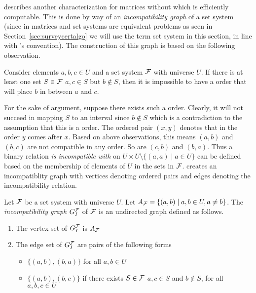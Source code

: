 \cite{mcc04} describes another characterization for matrices without
\COP which is efficiently computable. This is done by way of an {\em
  incompatibility graph} of a set system (since \COP in
  matrices and set systems are equivalent problems as seen in
  Section~\ref{sec:surveycertalgo} we will use the term set system in
  this section, in line with \cite{mcc04}'s convention). The
construction of this graph is based on the following observation.

\begin{observation} 
  Consider elements $a, b, c \in U$ and a set system ${\cal F}$ with
  universe $U$. If there is at least one set $S \in {\cal F}$ \stt $a, c
  \in S$ but $b \notin S$, then it is impossible to have a \COP order
  that will place $b$ in between $a$ and $c$. 
\end{observation}

For the sake of argument, suppose there exists such a \COP
order. Clearly, it will not succeed in mapping $S$ to an interval
since $b \notin S$ which is a contradiction to the assumption that
this is a \COP order.  The ordered pair $(x,y)$ denotes that in the
\COP order $y$ comes after $x$. Based on above observations, this
means $(a,b)$ and $(b,c)$ are not compatible in any \COP order. So are
$(c,b)$ and $(b,a)$.  Thus a binary relation {\em is incompatible
  with} on $U \times U \setminus \{(a,a) \mid a \in U\}$ can be
defined based on the membership of elements of $U$ in the sets in
${\cal F}$.  \cite{mcc04} creates an incompatiblity graph with vertices
denoting ordered pairs and edges denoting the incompatibility
relation.

\begin{definition}
  \label{def:incompatibility}
  Let ${\cal F}$ be a set system with universe $U$. Let $A_{{\cal F}} = \{(a,b)
  \mid a, b \in U, a \ne b\}$. The {\em incompatibility graph}
  $G_I^{\cal F}$ of ${\cal F}$ is an undirected graph defined as follows.
  \begin{enumerate}
  \item   The vertex set of $G_I^{\cal F}$ is $ A_{{\cal F}}$
  \item  The edge set of $G_I^{\cal F}$ are pairs of the following forms
    \begin{itemize}
    \item $\{(a,b),(b,a)\}$ for all $a, b \in U$
    \item $\{(a,b),(b,c)\}$ if there exists $S \in {\cal F}$ \stt $a, c
      \in S$ and $b \notin S$, for all $a, b, c \in U$
    \end{itemize}
  \end{enumerate}
  \dstop
\end{definition}

